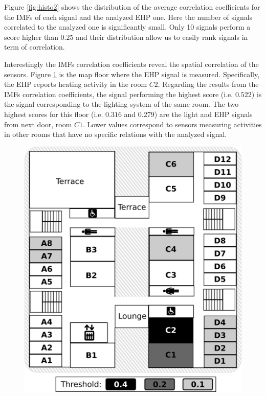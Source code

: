 Figure \ref{fig:histo2} shows the distribution of the average correlation coefficients for the IMFs of each signal and the analyzed EHP one.
Here the number of signals correlated to the analyzed one is significantly small. 
Only 10 signals perform a score higher than $0.25$ and their distribution allow us to easily rank signals in term of correlation.

Interestingly the IMFs correlation coefficients reveal the spatial correlation of the sensors.
Figure \ref{fig:map} is the map floor where the EHP signal is measured.
Specifically, the EHP reports heating activity in the room $C2$.
Regarding the results from the IMFs correlation coefficients, the signal performing the highest score (i.e. $0.522$) is the signal corresponding to the lighting system of the same room.
The two highest scores for this floor (i.e. $0.316$ and $0.279$) are the light and EHP signals from next door, room $C1$.
Lower values correspond to sensors measuring activities in other rooms that have no specific relations with the analyzed signal.

\begin{figure}
\includegraphics[width=.5\textwidth]{img/floorMap.png}
\caption{}
\label{fig:map}
\end{figure}
